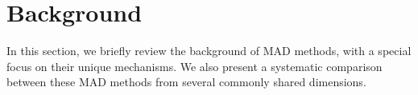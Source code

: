 \section{Background}
In this section, we briefly review the background of MAD methods, with a special focus on their unique mechanisms. We also present a systematic comparison between these MAD methods from several commonly shared dimensions. 




